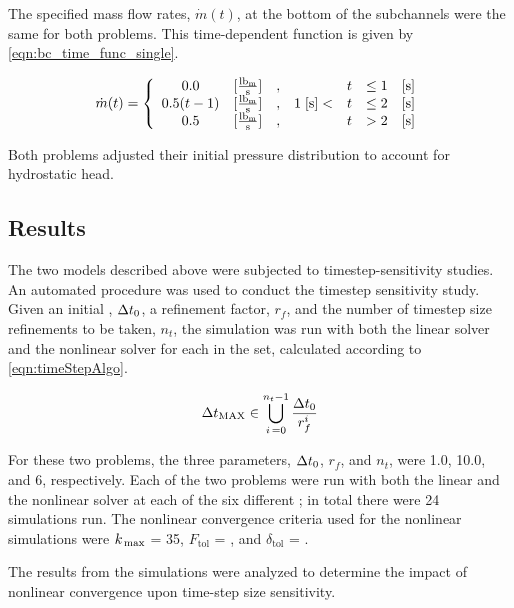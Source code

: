 The specified mass flow rates, $\dot{m}(t)$, at the bottom of the subchannels were the same for both problems. 
This time-dependent function is given by \eqref{eqn:bc_time_func_single}.

\begin{equation}
\label{eqn:bc_time_func_single}
\dot{m}(t) = \left\{
\begin{array}{cclrcll}
 0.0           & [\frac{ \lbm{} }{\text{s}}] & , &                & t & \leq 1 & [\text{s}] \\
 0.5 ( t - 1)  & [\frac{ \lbm{} }{\text{s}}] & , & 1\; [\text{s}] < & t & \leq 2 & [\text{s}] \\
 0.5           & [\frac{ \lbm{} }{\text{s}}] & , &                & t & > 2    & [\text{s}]
\end{array}\right.
\end{equation}

Both problems adjusted their initial pressure distribution to account for hydrostatic head.

\subsection{Results}
\label{subsect:single_results}

The two models described above were subjected to timestep-sensitivity studies.
An automated procedure was used to conduct the timestep sensitivity study.
Given an initial \dtmax{}, $\dt{}_{0}$, a refinement factor, $r_{f}$, and the number of timestep size refinements to be taken, $n_{t}$, the simulation was run with both the linear solver and the nonlinear solver for each \dtmax{} in the set, calculated according to \eqref{eqn:timeStepAlgo}.

\begin{equation}
\label{eqn:timeStepAlgo}
\dtmax{} \in \bigcup^{n_{t}-1}_{i\, = 0} \frac{\dt{}_{0}}{r^{i}_{f}}
\end{equation}

For these two problems, the three parameters, $\dt{}_{0}$, $r_{f}$, and $n_{t}$, were 1.0, 10.0, and 6, respectively.
Each of the two problems were run with both the linear and the nonlinear solver at each of the six different \dtmax{}; in total there were 24 simulations run.
The nonlinear convergence criteria used for the nonlinear simulations were $\kmax$ = 35, $F_{\text{tol}}$ = , and $\delta_{\text{tol}}$ = .

The results from the simulations were analyzed to determine the impact of nonlinear convergence upon time-step size sensitivity.


